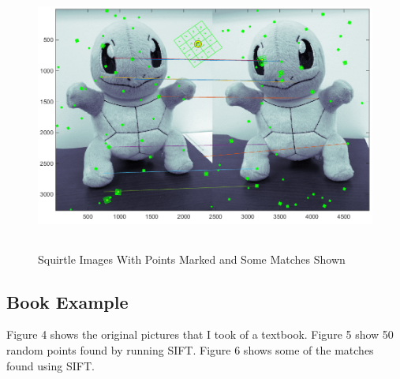 \documentclass[11pt,psfig]{article}
\begin{document}
\begin{figure}[H]
\centering
\includegraphics[height=3.5in]{squirtle_pointsWithMatching.png}
\caption{Squirtle Images With Points Marked and Some Matches Shown}
\label{sq3}
\end{figure}

\newpage

\subsection*{Book Example}

Figure 4 shows the original pictures that I took of a textbook. Figure 5 show 50 random points found by running SIFT. Figure 6 shows some of the matches found using SIFT. 
\end{document}
